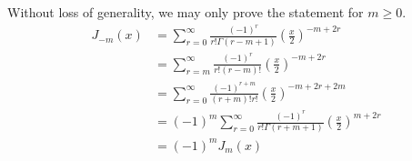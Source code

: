 \item

Without loss of generality, we may only prove the statement for $m \geq 0$.
\begin{align*}
    J_{-m}(x)
    &= \sum_{r = 0}^\infty \frac{{(-1)}^r}{r! \Gamma(r -m + 1)}
       {\left( \frac{x}{2} \right)}^{-m + 2r} \\
    &= \sum_{r = m}^\infty \frac{{(-1)}^r}{r! (r - m)!}
       {\left( \frac{x}{2} \right)}^{-m + 2r} \\
    &= \sum_{r = 0}^\infty \frac{{(-1)}^{r + m}}{(r + m)! r!}
       {\left( \frac{x}{2} \right)}^{-m + 2r + 2m} \\
    &= {(-1)}^m \sum_{r = 0}^\infty
       \frac{{(-1)}^r}{r! \Gamma(r + m + 1)}
       {\left( \frac{x}{2} \right)}^{m + 2r} \\
    &= {(-1)}^m J_m(x)
\end{align*}
